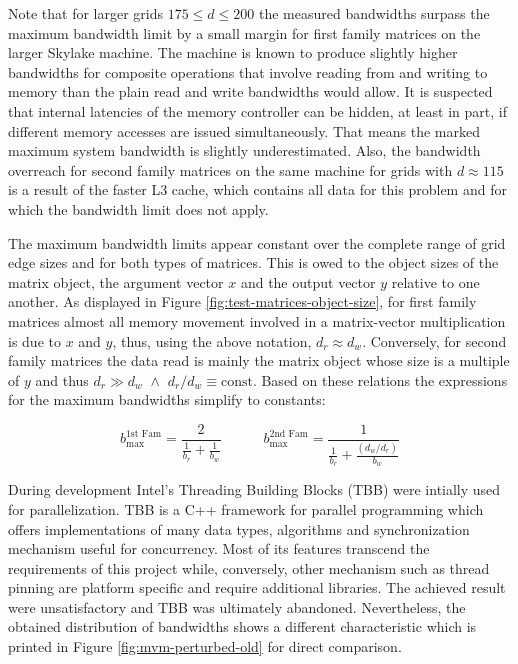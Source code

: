     Note that for larger grids $175 \leq d \leq 200$ the measured bandwidths surpass the maximum bandwidth limit by a
    small margin for first family matrices on the larger Skylake machine. The machine is known to produce slightly
    higher bandwidths for composite operations that involve reading from and writing to memory than the plain read and
    write bandwidths would allow. It is suspected that internal latencies of the memory controller can be hidden, at
    least in part, if different memory accesses are issued simultaneously. That means the marked maximum system
    bandwidth is slightly underestimated. Also, the bandwidth overreach for second family matrices on the same machine
    for grids with $d \approx 115$ is a result of the faster L3 cache, which contains all data for this problem and for
    which the bandwidth limit does not apply.

    The maximum bandwidth limits appear constant over the complete range of grid edge sizes and for both types of
    matrices. This is owed to the object sizes of the matrix object, the argument vector $x$ and the output vector $y$
    relative to one another. As displayed in Figure \ref{fig:test-matrices-object-size}, for first family matrices
    almost all memory movement involved in a matrix-vector multiplication is due to $x$ and $y$, thus, using the above
    notation, $d_r \approx d_w$. Conversely, for second family matrices the data read is mainly the matrix object whose
    size is a multiple of $y$ and thus $d_r \gg d_w \,\, \land \,\, d_r/d_w \equiv \text{const}$. Based on these
    relations the expressions for the maximum bandwidths simplify to constants:

    $$
      b_{\text{max}}^{\text{1st Fam}} = \frac{2}{\frac{1}{b_r} + \frac{1}{b_w}} \quad \quad \quad
      b_{\text{max}}^{\text{2nd Fam}} = \frac{1}{\frac{1}{b_r} + \frac{(d_w/d_r)}{b_w}}
    $$

    During development Intel's Threading Building Blocks (TBB) \cite{tbb:github} were intially used for parallelization.
    TBB is a C++ framework for parallel programming which offers implementations of many data types, algorithms and
    synchronization mechanism useful for concurrency. Most of its features transcend the requirements of this project
    while, conversely, other mechanism such as thread pinning are platform specific and require additional libraries.
    The achieved result were unsatisfactory and TBB was ultimately abandoned. Nevertheless, the obtained distribution of
    bandwidths shows a different characteristic which is printed in Figure \ref{fig:mvm-perturbed-old} for direct
    comparison.

